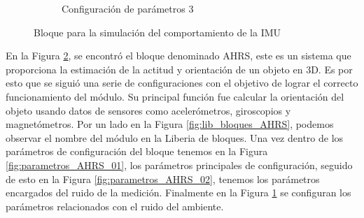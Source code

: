 \begin{figure}[htbp]
\begin{subfigure}[b]{0.45\textwidth}
        \caption{Configuración de parámetros 3}
        \label{fig:parametros_AHRS_03}
    \end{subfigure}

    \caption{Bloque para la simulación del comportamiento de la IMU}
    \label{fig:arreglo_AHRS}
\end{figure}

En la Figura \ref{fig:arreglo_AHRS}, se encontró el bloque denominado AHRS, este es un sistema que proporciona la estimación de la actitud y orientación de un objeto en 3D. Es por esto que se siguió una serie de configuraciones con el objetivo de lograr el correcto funcionamiento del módulo. Su principal función fue calcular la orientación del objeto usando datos de sensores como acelerómetros, giroscopios y magnetómetros. Por un lado en la Figura \ref{fig:lib_bloques_AHRS}, podemos observar el nombre del módulo en la Liberia de bloques. Una vez dentro de los parámetros de configuración del bloque tenemos en la Figura \ref{fig:parametros_AHRS_01}, los parámetros principales de configuración, seguido de esto en la Figura \ref{fig:parametros_AHRS_02}, tenemos los parámetros encargados del ruido de la medición. Finalmente en la Figura \ref{fig:parametros_AHRS_03} se configuran los parámetros relacionados con el ruido del ambiente. 
\newpage

